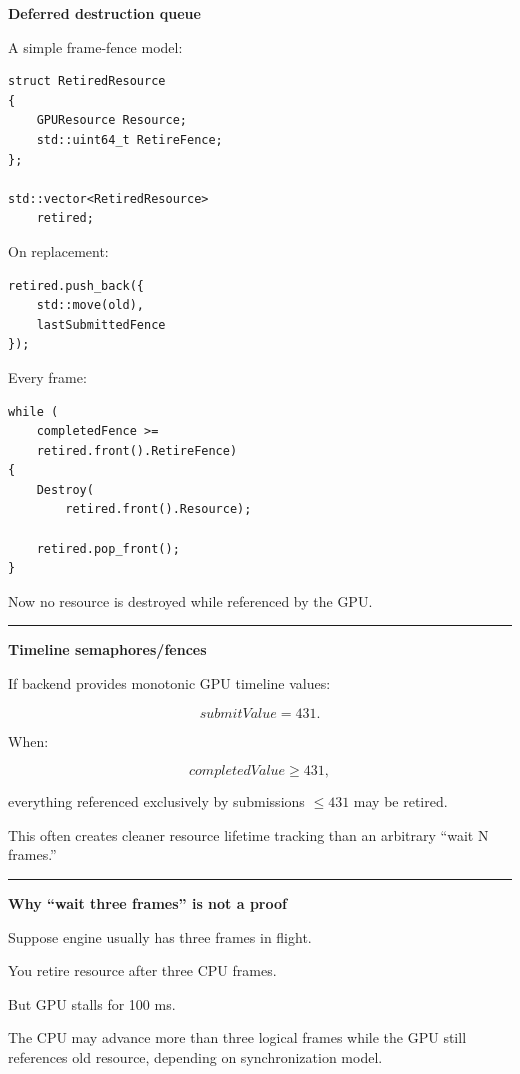 \textbf{Deferred destruction queue}

A simple frame-fence model:

\begin{verbatim}
struct RetiredResource
{
    GPUResource Resource;
    std::uint64_t RetireFence;
};

std::vector<RetiredResource>
    retired;
\end{verbatim}

On replacement:

\begin{verbatim}
retired.push_back({
    std::move(old),
    lastSubmittedFence
});
\end{verbatim}

Every frame:

\begin{verbatim}
while (
    completedFence >=
    retired.front().RetireFence)
{
    Destroy(
        retired.front().Resource);

    retired.pop_front();
}
\end{verbatim}

Now no resource is destroyed while referenced by the GPU.

\begin{center}\rule{0.5\linewidth}{0.5pt}\end{center}

\textbf{Timeline semaphores/fences}

If backend provides monotonic GPU timeline values:

\[
submitValue=431.
\]

When:

\[
completedValue\ge431,
\]

everything referenced exclusively by submissions \(\le431\) may be retired.

This often creates cleaner resource lifetime tracking than an arbitrary ``wait N frames.''

\begin{center}\rule{0.5\linewidth}{0.5pt}\end{center}

\textbf{Why ``wait three frames'' is not a proof}

Suppose engine usually has three frames in flight.

You retire resource after three CPU frames.

But GPU stalls for 100 ms.

The CPU may advance more than three logical frames while the GPU still references old resource, depending on synchronization model.

